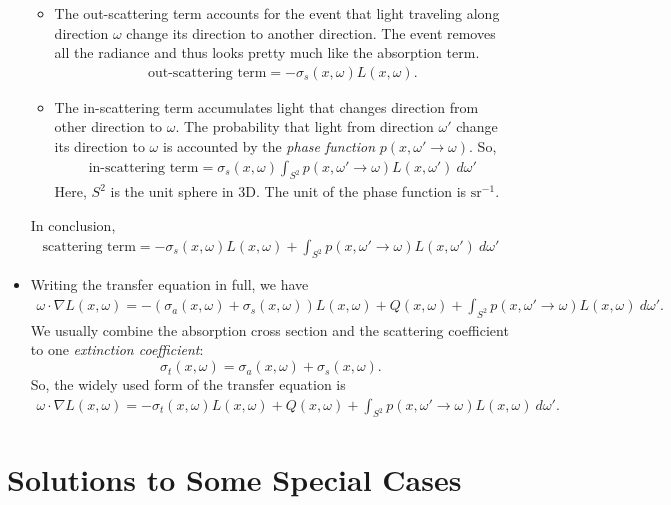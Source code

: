 \documentclass[10pt]{article}
\begin{document}
\begin{itemize}
\begin{itemize}
				\item The out-scattering term accounts for the event that light traveling along direction $\omega$
				change its direction to another direction. The event removes all the radiance and thus looks pretty much 
				like the absorption term.
				\begin{align*}
					\mbox{out-scattering term} = -\sigma_s(x,\omega) L(x,\omega).
				\end{align*}
				
				\item The in-scattering term accumulates light that changes direction from other direction
				to $\omega$. The probability that light from direction $\omega'$ change its direction
				to $\omega$ is accounted by the \emph{phase function} $p(x, \omega' \rightarrow \omega).$
				So,
				\begin{align*}
					\mbox{in-scattering term} = \sigma_s(x, \omega) \int_{S^2} p(x, \omega' \rightarrow \omega) L(x, \omega')\ d\omega'
				\end{align*}
				Here, $S^2$ is the unit sphere in 3D. The unit of the phase function is $\mathrm{sr}^{-1}$.
			\end{itemize}
			In conclusion,
			\begin{align*}
				\mbox{scattering term} = -\sigma_s(x, \omega) L(x, \omega) + \int_{S^2} p(x, \omega' \rightarrow \omega) L(x, \omega')\ d\omega'
			\end{align*}
		
		\item Writing the transfer equation in full, we have
			\begin{align*}
				\omega \cdot \nabla L(x,\omega) = -(\sigma_a(x, \omega) + \sigma_s(x, \omega)) L(x,\omega) + Q(x,\omega) + \int_{S^2} p(x, \omega' \rightarrow \omega) L(x,\omega)\ d\omega'.
			\end{align*}
			We usually combine the absorption cross section and the scattering coefficient to one \emph{extinction coefficient}:
			$$\sigma_t(x,\omega) = \sigma_a(x, \omega) + \sigma_s(x,\omega).$$ So, the widely used form of the transfer 
			equation is
			\begin{align*}
				\omega \cdot \nabla L(x,\omega) = -\sigma_t(x, \omega) L(x,\omega) + Q(x,\omega) + \int_{S^2} p(x, \omega' \rightarrow \omega) L(x,\omega)\ d\omega'.
			\end{align*}
	\end{itemize}
	
	\section{Solutions to Some Special Cases} %
	\label{sec:solutions_to_some_special_cases}
\end{document}
